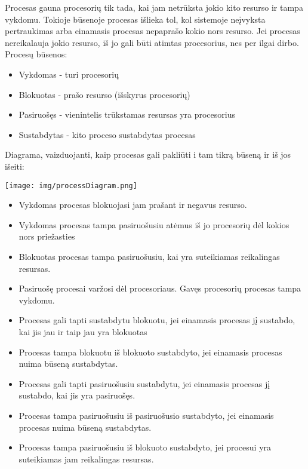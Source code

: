 Procesas gauna procesorių tik tada, kai jam netrūksta jokio kito resurso ir tampa vykdomu. Tokioje būsenoje procesas išlieka tol, kol sistemoje neįvyksta pertraukimas 
arba einamasis procesas nepaprašo kokio nors resurso. Jei procesas nereikalauja jokio resurso, iš jo gali būti atimtas procesorius, nes per ilgai dirbo.\\
Procesų būsenos:
	\begin{itemize}
		\item Vykdomas - turi procesorių
		\item Blokuotas - prašo resurso (išskyrus procesorių)
		\item Pasiruošęs - vienintelis trūkstamas resursas yra procesorius
		\item Sustabdytas - kito proceso sustabdytas procesas
	\end{itemize}

Diagrama, vaizduojanti, kaip procesas gali pakliūti i tam tikrą būseną ir iš jos išeiti:

\texttt{[image: img/processDiagram.png]}

	\begin{itemize}
		\item Vykdomas procesas blokuojasi jam prašant ir negavus resurso.
		\item Vykdomas procesas tampa pasiruošusiu atėmus iš jo procesorių dėl kokios nors priežasties
		\item Blokuotas procesas tampa pasiruošusiu, kai yra suteikiamas reikalingas resursas.
		\item Pasiruošę procesai varžosi dėl procesoriaus. Gavęs procesorių procesas tampa vykdomu.
		\item Procesas gali tapti sustabdytu blokuotu, jei einamasis procesas jį sustabdo, kai jis jau ir taip jau yra blokuotas
		\item Procesas tampa blokuotu iš blokuoto sustabdyto, jei einamasis procesas nuima būseną sustabdytas.
		\item Procesas gali tapti pasiruošusiu sustabdytu, jei einamasis procesas jį sustabdo, kai jis yra pasiruošęs.
		\item Procesas tampa pasiruošusiu iš pasiruošusio sustabdyto, jei einamasis procesas nuima būseną sustabdytas.
		\item Procesas tampa pasiruošusiu iš blokuoto sustabdyto, jei procesui yra suteikiamas jam reikalingas resursas.
	\end{itemize}


